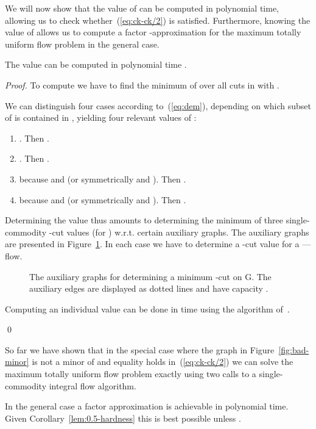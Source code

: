 We will now show that the value of  can be computed in
polynomial time, allowing us to check whether~(\ref{eq:ck-ck/2}) is
satisfied. Furthermore, knowing the value of  allows
us to compute a factor -approximation for the maximum totally
uniform flow problem in the general case.

\begin{lemma}
  The value  can be computed in polynomial time
  .
\end{lemma}

\begin{proof}
  To compute  we have to find the minimum of
   over all cuts  in  with .

  We can distinguish four cases according to~(\ref{eq:dem}), depending
  on which subset of  is contained in ,
  yielding four relevant values of :
  \begin{enumerate}
  \item . Then .
  \item . Then .
  \item  because  and  (or symmetrically  and ). Then .
  \item  because  and  (or symmetrically  and ). Then .
  \end{enumerate}
  Determining the value  thus amounts to determining
  the minimum of three single-commodity -cut values
  (for ) w.r.t. certain auxiliary
  graphs. The auxiliary graphs are presented in
  Figure~\ref{fig:aux-graphs}. In each case we have to determine a
  -cut value for a ---flow.
  \begin{figure}
    \centering
    \caption{The auxiliary graphs for determining a minimum
      -cut on G. The auxiliary edges are displayed as dotted
      lines and have capacity .}
    \label{fig:aux-graphs}
  \end{figure}

  Computing an individual value  can be done in time
   using the algorithm of~\cite{baier-koehler-skutella:05}.

\qed \end{proof}

So far we have shown that in the special case where the graph in
Figure~\ref{fig:bad-minor} is not a minor of  and equality holds
in~(\ref{eq:ck-ck/2}) we can solve the maximum totally
uniform flow problem exactly using two calls to a single-commodity
integral flow algorithm.

In the general case a factor  approximation
is achievable in polynomial time. Given
Corollary~\ref{lem:0.5-hardness} this is best possible unless .


